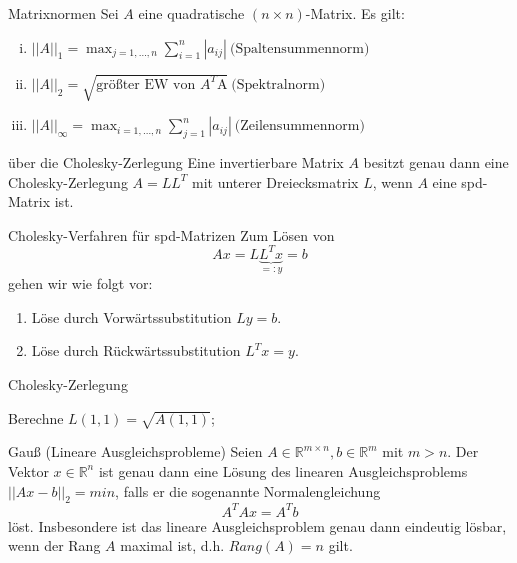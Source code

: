 \begin{flashcard}[Satz]{Matrixnormen}
Sei $A$ eine quadratische $(n \times n)$-Matrix. Es gilt:
\begin{enumerate}[(i)]
	\item $\displaystyle ||A||_1 = \max_{j=1,\ldots,n} \sum_{i=1}^n |a_{ij}| \ \text{(Spaltensummennorm)}$
	\item $\displaystyle ||A||_2 = \sqrt{\text{größter EW von $A^T$A}} \ \text{(Spektralnorm)}$
	\item $\displaystyle ||A||_\infty = \max_{i=1,\ldots,n} \sum_{j=1}^n |a_{ij}| \ \text{(Zeilensummennorm)}$
\end{enumerate}
\end{flashcard}

\begin{flashcard}[Satz]{über die Cholesky-Zerlegung}
Eine invertierbare Matrix $A$ besitzt genau dann eine Cholesky-Zerlegung $A = LL^T$ mit unterer Dreiecksmatrix $L$, wenn $A$ eine spd-Matrix ist.
\end{flashcard}

\begin{flashcard}[Algorithmus]{Cholesky-Verfahren für spd-Matrizen}
Zum Lösen von
$$Ax = L \underbrace{L^T x}_{=:y} = b$$
gehen wir wie folgt vor:
\begin{enumerate}
	\item Löse durch Vorwärtssubstitution $Ly = b$.
	\item Löse durch Rückwärtssubstitution $L^Tx = y$.
\end{enumerate}
\end{flashcard}

\begin{flashcard}[Algorithmus]{Cholesky-Zerlegung}
\begin{algorithm}[H]
	Berechne $L(1,1) = \sqrt{A(1,1)}$;\\
\end{algorithm}
\end{flashcard}

\begin{flashcard}[Satz]{Gauß (Lineare Ausgleichsprobleme)}
Seien $A \in \mathbb{R}^{m \times n}, b \in \mathbb{R}^m$ mit $m > n$. Der Vektor $x \in \mathbb{R}^n$ ist genau dann eine Lösung des linearen Ausgleichsproblems $||Ax -b||_2 = min$, falls er die sogenannte Normalengleichung
$$A^TAx = A^Tb$$
löst. Insbesondere ist das lineare Ausgleichsproblem genau dann eindeutig lösbar, wenn der Rang $A$ maximal ist, d.h. $Rang(A) = n$ gilt.
\end{flashcard}
